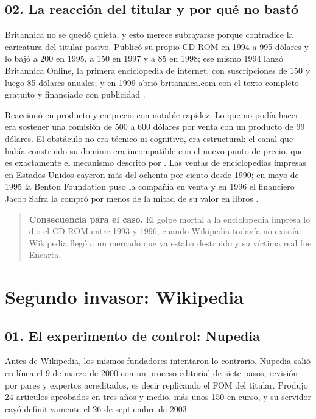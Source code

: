\documentclass[11pt,letterpaper]{article}
\begin{document}
\subsection*{02. La reacción del titular y por qué no bastó}

Britannica no se quedó quieta, y esto merece subrayarse porque contradice la
caricatura del titular pasivo. Publicó su propio CD-ROM en 1994 a 995 dólares y
lo bajó a 200 en 1995, a 150 en 1997 y a 85 en 1998; ese mismo 1994 lanzó
Britannica Online, la primera enciclopedia de internet, con suscripciones de 150
y luego 85 dólares anuales; y en 1999 abrió britannica.com con el texto completo
gratuito y financiado con publicidad \parencite{smith2017}.

Reaccionó en producto y en precio con notable rapidez. Lo que no podía hacer era
sostener una comisión de 500 a 600 dólares por venta con un producto de 99
dólares. El obstáculo no era técnico ni cognitivo, era estructural: el canal que
había construido su dominio era incompatible con el nuevo punto de precio, que
es exactamente el mecanismo descrito por \textcite{christensen1997}. Las ventas
de enciclopedias impresas en Estados Unidos cayeron más del ochenta por ciento
desde 1990; en mayo de 1995 la Benton Foundation puso la compañía en venta y en
1996 el financiero Jacob Safra la compró por menos de la mitad de su valor en
libros \parencite{evans1997}.

\begin{quote}
\textbf{Consecuencia para el caso.} El golpe mortal a la enciclopedia impresa lo
dio el CD-ROM entre 1993 y 1996, cuando Wikipedia todavía no existía. Wikipedia
llegó a un mercado que ya estaba destruido y su víctima real fue Encarta.
\end{quote}

\section{Segundo invasor: Wikipedia}

\subsection*{01. El experimento de control: Nupedia}

Antes de Wikipedia, los mismos fundadores intentaron lo contrario. Nupedia
salió en línea el 9 de marzo de 2000 con un proceso editorial de siete pasos,
revisión por pares y expertos acreditados, es decir replicando el FOM del
titular. Produjo 24 artículos aprobados en tres años y medio, más unos 150 en
curso, y su servidor cayó definitivamente el 26 de septiembre de 2003
\parencite{nupediawiki}.
\end{document}
